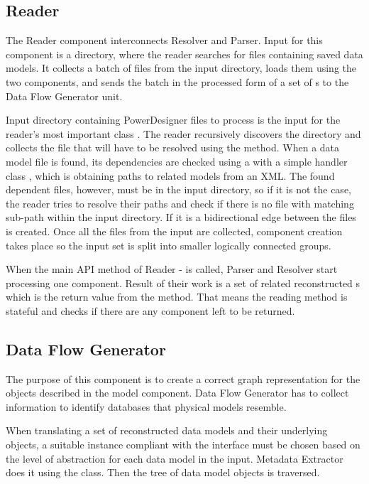 \subsection{Reader}

The Reader component interconnects Resolver and Parser. Input for this component is a directory, where the reader searches for files containing saved data models. It collects a batch of files from the input directory, loads them using the two components, and sends the batch in the processed form of a set of s to the Data Flow Generator unit.

Input directory containing PowerDesigner files to process is the input for the reader's most important class . 
The reader recursively discovers the directory and collects the file that will have to be resolved using the  method. 
When a data model file is found, its dependencies are checked using a  with a simple handler class , which is obtaining paths to related models from an XML.
The found dependent files, however, must be in the input directory, so if it is not the case, the reader tries to resolve their paths and check if there is no file with matching sub-path within the input directory. If it is a bidirectional edge between the files is created. 
Once all the files from the input are collected, component creation takes place so the input set is split into smaller logically connected groups.

When the main API method of Reader -  is called, Parser and Resolver start processing one component. Result of their work is a set of related reconstructed s which is the return value from the method. 
That means the reading method is stateful and  checks if there are any component left to be returned.

\subsection{Data Flow Generator}

The purpose of this component is to create a correct graph representation for the objects described in the model component. Data Flow Generator has to collect information to identify databases that physical models resemble.

When translating a set of reconstructed data models and their underlying objects, a suitable instance compliant with the  interface must be chosen based on the level of abstraction for each data model in the input. Metadata Extractor does it using the  class.
Then the tree of data model objects is traversed.

